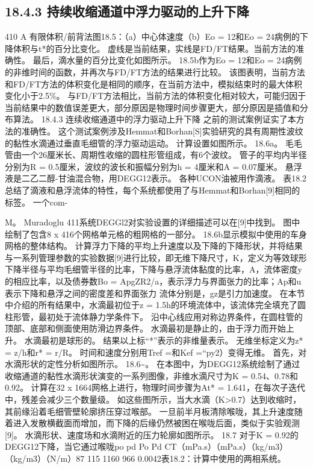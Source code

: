 \documentclass[UTF8,11pt,a4paper,openany,fontset=fandol]{ctexbook}
\begin{document}
\subsection{18.4.3 持续收缩通道中浮力驱动的上升下降}
410 A 有限体积/前背法图18.5：（a）中心体速度（b）Eo = 12和Eo = 24病例的下降体积与t*的百分比变化。 虚线是当前结果，实线是FD/FT结果。当前方法的准确性。 最后，滴水量的百分比变化如图所示。 18.5b作为Eo = 12和Eo = 24病例的非维时间的函数，并再次与FD/FT方法的结果进行比较。 该图表明，当前方法和FD/FT方法的体积变化是相同的顺序，在当前方法中，模拟结束时的最大体积变化小于2.5\%。 与FD/FT方法相比，当前方法的体积变化相对较大，可能归因于当前结果中的数值误差更大，部分原因是物理时间步骤更大，部分原因是插值和分布算法。 18.4.3 连续收缩通道中的浮力驱动上升下降 之前的测试案例证实了本方法的准确性。 这个测试案例涉及Hemmat和Borhan[S]实验研究的具有周期性波纹的黏性水滴通过垂直毛细管的浮力驱动运动。 计算设置如图所示。 18.6a。 毛毛管由一个26厘米长、周期性收缩的圆柱形管组成，有6个波纹。 管子的平均内半径分别为R = 0.5厘米，波纹的波长和振幅分别为h = 4厘米和A = 0.07厘米。 悬浮液是二乙二醇-甘油混合物，用DEGG12表示。 各种UCON油被用作滴液。 表18.2总结了滴液和悬浮流体的特性，每个系统都使用了与Hemmat和Borhan[9]相同的标签。 一个com-

M。 Muradoglu 411系统DEGGl2对实验设置的详细描述可以在[9]中找到。 图中绘制了包含8 x 416个网格单元格的粗网格的一部分。 18.6b显示模拟中使用的车身网格的整体结构。 计算浮力下降的平均上升速度以及下降的下降形状，并将结果与一系列管理参数的实验数据[9]进行比较，即无维下降尺寸，K，定义为等效球形下降半径与平均毛细管半径的比率，下降与悬浮流体黏度的比率，A，流体密度y的相应比率，以及债券数Bo = ApgZR2/a，表示浮力与界面张力的比率；Ap和u表示下降和悬浮之间的密度差和界面张力 流体分别是，gz是引力加速度。 在本节中介绍的所有结果中，水滴最初位于z = 1.5h的环境流体中，该流体完全填充了圆柱形管，最初处于流体静力学条件下。 沿中心线应用对称边界条件，在圆柱管的顶部、底部和侧面使用防滑边界条件。 水滴最初是静止的，由于浮力而开始上升。 水滴最初是球形的。 结果以上标“*”表示的非维量表示。 无维坐标定义为z* = z/h和r* = r/R。 时间和速度分别用Tref =和Kef =“py2）变得无维。 首先，对水滴形状的定性分析如图所示。 18.6\textasciitilde{}。 在本图中，为DEGG12系统绘制了通过收缩通道的黏性水滴形状演变的一系列图像，非维水滴尺寸为K = 0.54、0.78和0.92。 计算在32 x 1664网格上进行，物理时间步骤为At* = 1.641，在每次子迭代中，残差会减少三个数量级。 如这些图所示，当大水滴（K>0.7）达到收缩时，其前缘沿着毛细管壁轮廓挤压穿过喉部。 一旦前半月板清除喉咙，其上升速度随着进入发散横截面而增加，而下降的后缘仍然被困在喉咙后面，类似于实验观测[9]。 水滴形状、速度场和水滴附近的压力轮廓如图所示。 18.7 对于K = 0.92的DEGG12下降，当它通过喉咙po pd Po Pd CT（mPa.s）（mPa.s）（kg/m3）（kg/m3）（N/m）87 115 1160 966 0.0042表18.2：计算中使用的两相系统。
\end{document}
